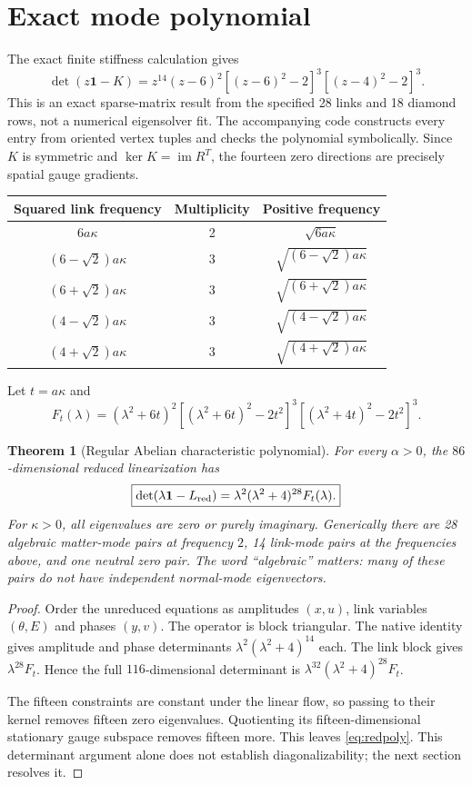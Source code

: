 \documentclass[11pt,a4paper]{article}
\newtheorem{theorem}{Theorem}\newtheorem{proposition}[theorem]{Proposition}\newtheorem{corollary}[theorem]{Corollary}
\newcommand{\id}{\mathbf1}\newcommand{\dd}{\mathrm d}\newcommand{\diag}{\operatorname{diag}}
\begin{document}
\newpage
\section{Exact mode polynomial}
The exact finite stiffness calculation gives
\begin{equation}
\det(z\id-K)=z^{14}(z-6)^2[(z-6)^2-2]^3[(z-4)^2-2]^3.\label{eq:Kpoly}
\end{equation}
This is an exact sparse-matrix result from the specified 28 links and 18 diamond rows, not a numerical eigensolver fit. The accompanying code constructs every entry from oriented vertex tuples and checks the polynomial symbolically. Since $K$ is symmetric and $\ker K=\operatorname{im}R^T$, the fourteen zero directions are precisely spatial gauge gradients.

\begin{center}
\begin{tabular}{ccc}
\toprule
Squared link frequency & Multiplicity & Positive frequency\\\midrule
$6a\kappa$ & 2 & $\sqrt{6a\kappa}$\\
$(6-\sqrt2)a\kappa$ & 3 & $\sqrt{(6-\sqrt2)a\kappa}$\\
$(6+\sqrt2)a\kappa$ & 3 & $\sqrt{(6+\sqrt2)a\kappa}$\\
$(4-\sqrt2)a\kappa$ & 3 & $\sqrt{(4-\sqrt2)a\kappa}$\\
$(4+\sqrt2)a\kappa$ & 3 & $\sqrt{(4+\sqrt2)a\kappa}$\\\bottomrule
\end{tabular}
\end{center}
Let $t=a\kappa$ and
\[
F_t(\lambda)=(\lambda^2+6t)^2
[(\lambda^2+6t)^2-2t^2]^3
[(\lambda^2+4t)^2-2t^2]^3.
\]
\begin{theorem}[Regular Abelian characteristic polynomial]
For every $\alpha>0$, the $86$-dimensional reduced linearization has
\begin{equation}
\boxed{\det(\lambda\id-L_{\rm red})=
\lambda^2(\lambda^2+4)^{28}F_t(\lambda).}\label{eq:redpoly}
\end{equation}
For $\kappa>0$, all eigenvalues are zero or purely imaginary. Generically there are 28 algebraic matter-mode pairs at frequency $2$, 14 link-mode pairs at the frequencies above, and one neutral zero pair. The word ``algebraic'' matters: many of these pairs do not have independent normal-mode eigenvectors.
\end{theorem}
\begin{proof}
Order the unreduced equations as amplitudes $(x,u)$, link variables $(\theta,E)$ and phases $(y,v)$. The operator is block triangular. The native identity gives amplitude and phase determinants $\lambda^2(\lambda^2+4)^{14}$ each. The link block gives $\lambda^{28}F_t$. Hence the full $116$-dimensional determinant is $\lambda^{32}(\lambda^2+4)^{28}F_t$.

The fifteen constraints are constant under the linear flow, so passing to their kernel removes fifteen zero eigenvalues. Quotienting its fifteen-dimensional stationary gauge subspace removes fifteen more. This leaves \eqref{eq:redpoly}. This determinant argument alone does not establish diagonalizability; the next section resolves it.
\end{proof}
\end{document}
